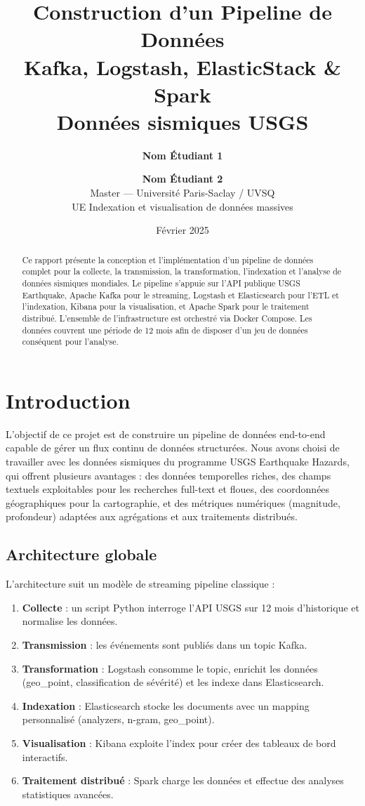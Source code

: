 \documentclass[12pt,a4paper]{article}
\title{
    \vspace{-1cm}
    \textbf{Construction d'un Pipeline de Données}\\[0.3cm]
    \Large Kafka, Logstash, ElasticStack \& Spark\\[0.3cm]
    \large Données sismiques USGS
}
\author{
    \textbf{Nom Étudiant 1} \and \textbf{Nom Étudiant 2}\\[0.2cm]
    \normalsize Master --- Université Paris-Saclay / UVSQ\\
    \normalsize UE Indexation et visualisation de données massives
}
\date{Février 2025}
\begin{document}
\maketitle
\thispagestyle{fancy}

\begin{abstract}
Ce rapport présente la conception et l'implémentation d'un pipeline de données complet pour la collecte, la transmission, la transformation, l'indexation et l'analyse de données sismiques mondiales. Le pipeline s'appuie sur l'API publique USGS Earthquake, Apache Kafka pour le streaming, Logstash et Elasticsearch pour l'ETL et l'indexation, Kibana pour la visualisation, et Apache Spark pour le traitement distribué. L'ensemble de l'infrastructure est orchestré via Docker Compose. Les données couvrent une période de 12 mois afin de disposer d'un jeu de données conséquent pour l'analyse.
\end{abstract}

\tableofcontents
\newpage

\section{Introduction}

L'objectif de ce projet est de construire un pipeline de données end-to-end capable de gérer un flux continu de données structurées. Nous avons choisi de travailler avec les données sismiques du programme USGS Earthquake Hazards, qui offrent plusieurs avantages : des données temporelles riches, des champs textuels exploitables pour les recherches full-text et floues, des coordonnées géographiques pour la cartographie, et des métriques numériques (magnitude, profondeur) adaptées aux agrégations et aux traitements distribués.

\subsection{Architecture globale}

L'architecture suit un modèle de streaming pipeline classique :

\begin{enumerate}[noitemsep]
    \item \textbf{Collecte} : un script Python interroge l'API USGS sur 12 mois d'historique et normalise les données.
    \item \textbf{Transmission} : les événements sont publiés dans un topic Kafka.
    \item \textbf{Transformation} : Logstash consomme le topic, enrichit les données (geo\_point, classification de sévérité) et les indexe dans Elasticsearch.
    \item \textbf{Indexation} : Elasticsearch stocke les documents avec un mapping personnalisé (analyzers, n-gram, geo\_point).
    \item \textbf{Visualisation} : Kibana exploite l'index pour créer des tableaux de bord interactifs.
    \item \textbf{Traitement distribué} : Spark charge les données et effectue des analyses statistiques avancées.
\end{enumerate}
\end{document}
